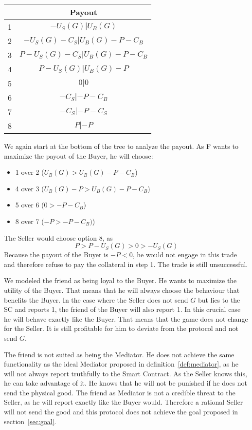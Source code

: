 \documentclass{cacthesis}
\begin{document}
\begin{center}
\begin{tabular}{ |c|c| }
\hline
& Payout  \\
\hline
\hline
1& $-U_S(G) | U_B(G)$\\
\hline
2& $-U_S(G) - C_S| U_B(G)- P - C_B $\\
\hline
3&$P-U_S(G) - C_S | U_B(G) -P - C_B$ \\
\hline
4& $P-U_S(G)| U_B(G)-P$\\
\hline
5& $0|0$\\
\hline 
6& $-C_S |-P - C_B$\\
\hline
7& $- C_S| -P-C_S$\\
\hline
8& $P| -P$\\
\hline
\end{tabular}
\end{center}

We again start at the bottom of the tree to analyze the payout. As F wants to maximize the payout of the Buyer, he will choose:
\begin{itemize}
    \item 1 over 2 ($U_B(G) > U_B(G) -P -C_B$)
    \item 4 over 3 ($U_B(G) - P > U_B(G) -P -C_B$)
    \item 5 over 6 ($0 > -P -C_B$)
    \item 8 over 7 ($-P > -P -C_B)$)
\end{itemize}
The Seller would choose option 8, as 
\[P>P-U_S(G)>0>-U_S(G)\]
Because the payout of the Buyer is $-P<0$, he would not engage in this trade and therefore refuse to pay the collateral in step 1. The trade is still unsuccessful.\newline

We modeled the friend as being loyal to the Buyer. He wants to maximize the utility of the Buyer.
That means that he will always choose the behaviour that benefits the Buyer. In the case where the Seller does not send $G$ but lies to the SC and reports 1, the friend of the Buyer will also report 1. In this crucial case he will behave exactly like the Buyer. That means that the game does not change for the Seller. It is still profitable for him to deviate from the protocol and not send $G$.\newline

The friend is not suited as being the Mediator. He does not achieve the same functionality as the ideal Mediator proposed in definition~\ref{def:mediator}, as he will not always report truthfully to the Smart Contract. As the Seller knows this, he can take advantage of it. He knows that he will not be punished if he does not send the physical good. The friend as Mediator is not a credible threat to the Seller, as he will report exactly like the Buyer would. Therefore a rational Seller will not send the good and this protocol does not achieve the goal proposed in section~\ref{sec:goal}.\newline
\end{document}
